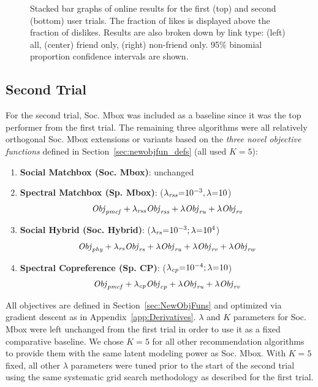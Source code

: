 \begin{figure}[t!]
\vspace{-2mm}
\caption{Stacked bar graphs of online results for the first (top)
and second (bottom) user trials.  The fraction of likes is displayed
above the fraction of dislikes.  Results are also broken down by link
type: (left) all, (center) friend only, (right) non-friend only.  95\%
binomial proportion confidence intervals are shown.}
\label{fig:trial_results}
\end{figure}


\subsection{Second Trial} 

For the second trial, Soc. Mbox 
was included as a baseline since it was the top performer
from the first trial.  The remaining three algorithms
were all relatively orthogonal Soc. Mbox extensions or variants 
based on the \emph{three novel objective functions} defined in 
Section~\ref{sec:newobjfun_defs} (all used $K=5$):
\denselist
\begin{enumerate}
\item {\bf Social Matchbox (Soc. Mbox)}: unchanged
\item {\bf Spectral Matchbox \sq (Sp. \sq Mbox)}: \sq ($\lambda_{\mathit{rss}}\hspace{-.9mm}=\hspace{-.9mm} 10^{-3}, \lambda\hspace{-.9mm}=\hspace{-.9mm} 10$)
$$\mathit{Obj}_{\mathit{pmcf}} + \lambda_{\mathit{rss}} \mathit{Obj}_{\mathit{rss}} + \lambda \mathit{Obj}_{\mathit{ru}} + \lambda \mathit{Obj}_{\mathit{rv}}$$
\item {\bf Social Hybrid (Soc. Hybrid)}: ($\lambda_{\mathit{rs}} \hspace{-.9mm} = \hspace{-.9mm} 10^{-3}; \lambda \hspace{-.9mm} = \hspace{-.9mm} 10^4$) 
$$\mathit{Obj}_{\mathit{phy}} + \lambda_{\mathit{rs}} \mathit{Obj}_{\mathit{rs}} + \lambda \mathit{Obj}_{\mathit{ru}} + \lambda \mathit{Obj}_{\mathit{rv}} + \lambda \mathit{Obj}_{\mathit{rw}}$$
\item {\bf Spectral \sqt Copreference \sq (Sp. \sq CP)}: \sql ($\lambda_{\mathit{cp}} \hspace{-.9mm} = \hspace{-.9mm} 10^{-4}; \lambda \hspace{-.9mm} = \hspace{-.9mm} 10$)
$$\mathit{Obj}_{\mathit{pmcf}} + \lambda_{\mathit{cp}} \mathit{Obj}_{\mathit{cp}} + \lambda \mathit{Obj}_{\mathit{ru}} + \lambda \mathit{Obj}_{\mathit{rv}}$$
\end{enumerate}
All objectives are defined in Section~\ref{sec:NewObjFuns} and
optimized via gradient descent as in Appendix~\ref{app:Derivatives}.
$\lambda$ and $K$ parameters for Soc. Mbox were left unchanged from
the first trial in order to use it as a fixed comparative baseline.  We chose
$K=5$ for all other recommendation algorithms to provide them with the same
latent modeling power as Soc. Mbox.  With $K=5$ fixed, all other
$\lambda$ parameters were tuned prior to the start of the second trial
using the same systematic grid search methodology as described for the 
first trial.

